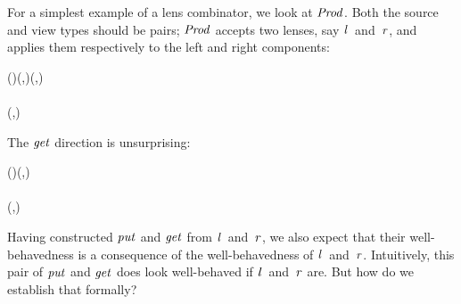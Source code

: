 For a simplest example of a lens combinator, we look at \ensuremath{\Conid{Prod}}.
Both the source and view types should be pairs; \ensuremath{\Conid{Prod}} accepts two lenses, say \ensuremath{\Varid{l}}~and~\ensuremath{\Varid{r}}, and applies them respectively to the left and right components:
\begin{hscode}\SaveRestoreHook
{}%
%
%
%
%
%
\>[B]{}\;()\;(,)\;(,)\mathrel{=}\;{}\<[42]%
\>[42]{}\<[47]%
\>[47]{}\leftarrow {}\;\;{}\<[57]%
\>[57]{}\;{}\<[61]%
\>[61]{}\<[E]%
\\
\>[42]{}\<[47]%
\>[47]{}\leftarrow {}\;\;{}\<[57]%
\>[57]{}\;{}\<[61]%
\>[61]{}\<[E]%
\\
\>[42]{}\;(,){}\<[E]%
\ColumnHook
\end{hscode}\resethooks
The \ensuremath{\Varid{get}} direction is unsurprising:
\begin{hscode}\SaveRestoreHook
{}%
%
%
%
%
\>[B]{}\;()\;(,)\mathrel{=}\;{}\<[33]%
\>[33]{}\<[37]%
\>[37]{}\leftarrow {}\;\;{}\<[47]%
\>[47]{}\<[E]%
\\
\>[33]{}\<[37]%
\>[37]{}\leftarrow {}\;\;{}\<[47]%
\>[47]{}\<[E]%
\\
\>[33]{}\;(,){}\<[E]%
\ColumnHook
\end{hscode}\resethooks
Having constructed \ensuremath{\Varid{put}} and \ensuremath{\Varid{get}} from \ensuremath{\Varid{l}}~and~\ensuremath{\Varid{r}}, we also expect that their well-behavedness is a consequence of the well-behavedness of \ensuremath{\Varid{l}}~and~\ensuremath{\Varid{r}}.
Intuitively, this pair of \ensuremath{\Varid{put}} and \ensuremath{\Varid{get}} does look well-behaved if \ensuremath{\Varid{l}}~and~\ensuremath{\Varid{r}} are. But how do we establish that formally?
